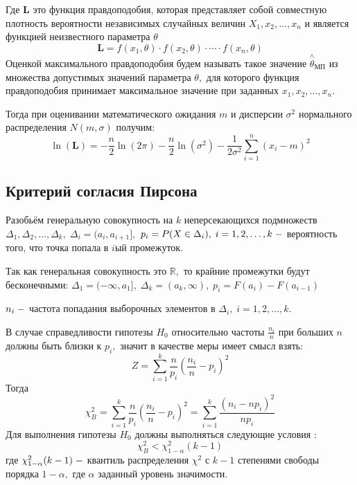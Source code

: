 \documentclass[12pt]{report}
\begin{document}
Где $\mathbf{L}$ это функция правдоподобия, которая представляет собой совместную плотность вероятности независимых случайных величин $X_1,x_2,\ldots,x_n$ и является функцией неизвестного параметра $\theta$
\begin{equation}
    \mathbf{L} = f(x_1,\theta)\cdot f(x_2,\theta)\cdot\cdots\cdot f(x_n,\theta)
\end{equation}
Оценкой максимального правдоподобия будем называть такое значение $\overset{\wedge}{\theta}_{\text{МП}}$ из множества допустимых значений параметра $\theta,$ для которого функция правдоподобия принимает максимальное значение при заданных $x_1,x_2,\ldots,x_n.$

Тогда при оценивании математического ожидания $m$ и дисперсии $\sigma^2$ нормального распределения $N(m,\sigma)$ получим:
\begin{equation}
    \ln(\mathbf{L})=-\frac{n}{2}\ln(2\pi)-\frac{n}{2}\ln\left(\sigma^2\right)-\frac{1}{2\sigma^2}\sum\limits_{i=1}^n(x_i-m)^2
\end{equation}

\subsection{Критерий согласия Пирсона}
Разобьём генеральную совокупность на $k$ неперсекающихся подмножеств $\Delta_1, \Delta_2,\ldots, \Delta_k,\;\Delta_i = (a_i,a_{i+1}],$ $p_i = P(X\in\Delta_i),\;i=1,2,\ldots,k\; \--$ вероятность того, что точка попала в $i$ый промежуток.

Так как генеральная совокупность это $\mathbb{R},$ то крайние промежутки будут бесконечными: $\Delta_1=(-\infty,a_1],\;\Delta_k=(a_k,\infty),\;p_i = F(a_i)-F(a_{i-1})$

$n_i\;\--$ частота попадания выборочных элементов в $\Delta_i,\;i=1,2,\ldots,k.$

В случае справедливости гипотезы $H_0$ относительно частоты $\frac{n_i}{n}$ при больших $n$ должны быть близки к $p_i,$ значит в качестве меры имеет смысл взять: 
\begin{equation}
    Z = \sum\limits_{i=1}^k\frac{n}{p_i}\left(\frac{n_i}{n}-p_i\right)^2
\end{equation}
Тогда
\begin{equation}
    \chi^2_B=\sum\limits_{i=1}^k\frac{n}{p_i}\left(\frac{n_i}{n}-p_i\right)^2=\sum\limits_{i=1}^k\frac{(n_i-np_i)^2}{np_i}
\end{equation}
Для выполнения гипотезы $H_0$ должны выполняться следующие условия \cite{7_2}:
\begin{equation}
    \chi_B^2 < \chi_{1-\alpha}^2(k-1)
\end{equation}
где $\chi_{1-\alpha}^2(k-1)\;\--$ квантиль распределения $\chi^2$ с $k-1$ степенями свободы порядка $1-\alpha,$ где $\alpha$ заданный уровень значимости.
\end{document}
